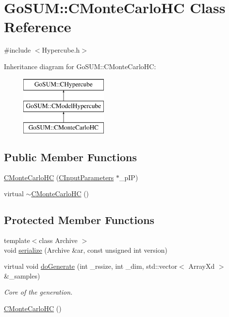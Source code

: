 \hypertarget{class_go_s_u_m_1_1_c_monte_carlo_h_c}{\section{Go\-S\-U\-M\-:\-:C\-Monte\-Carlo\-H\-C Class Reference}
\label{class_go_s_u_m_1_1_c_monte_carlo_h_c}
}


{\ttfamily \#include $<$Hypercube.\-h$>$}

Inheritance diagram for Go\-S\-U\-M\-:\-:C\-Monte\-Carlo\-H\-C\-:\begin{figure}[H]
\begin{center}
\leavevmode
\includegraphics[height=3.000000cm]{class_go_s_u_m_1_1_c_monte_carlo_h_c}
\end{center}
\end{figure}
\subsection*{Public Member Functions}
\begin{DoxyCompactItemize}
\item 
\hyperlink{class_go_s_u_m_1_1_c_monte_carlo_h_c_a1c2bd67f24a78e2ff904a23f84d83a68}{C\-Monte\-Carlo\-H\-C} (\hyperlink{class_go_s_u_m_1_1_c_input_parameters}{C\-Input\-Parameters} $\ast$\-\_\-p\-I\-P)
\item 
virtual \hyperlink{class_go_s_u_m_1_1_c_monte_carlo_h_c_a0659b61e6b18bfcdb61dac921ac7a2ad}{$\sim$\-C\-Monte\-Carlo\-H\-C} ()
\end{DoxyCompactItemize}
\subsection*{Protected Member Functions}
\begin{DoxyCompactItemize}
\item 
{\footnotesize template$<$class Archive $>$ }\\void \hyperlink{class_go_s_u_m_1_1_c_monte_carlo_h_c_ae04ab348b02072028893eee2541cadf8}{serialize} (Archive \&ar, const unsigned int version)
\item 
virtual void \hyperlink{class_go_s_u_m_1_1_c_monte_carlo_h_c_a848c0dded522350b9d6edb41497e19d1}{do\-Generate} (int \-\_\-rssize, int \-\_\-dim, std\-::vector$<$ Array\-Xd $>$ \&\-\_\-samples)
\begin{DoxyCompactList}\small\item\em Core of the generation. \end{DoxyCompactList}\item 
\hyperlink{class_go_s_u_m_1_1_c_monte_carlo_h_c_a04808b65118e1f197d1af47474bd8f57}{C\-Monte\-Carlo\-H\-C} ()
\end{DoxyCompactItemize}
